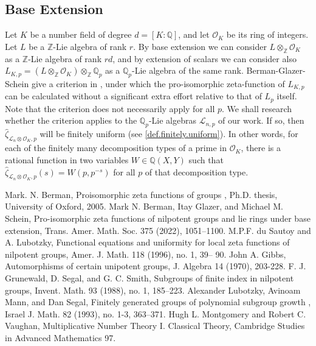\documentclass[12pt]{article}
\begin{document}
\subsection{Base Extension}
Let $K$ be a number field of degree $d=[K:\mathbb{Q}]$, and let $\mathcal{O}_K$ be its ring of integers. Let $L$ be a $\mathbb{Z}$-Lie algebra of rank $r$. By base extension we can consider $L\otimes_{\mathbb{Z}}\mathcal{O}_K$ as a $\mathbb{Z}$-Lie algebra of rank $rd$, and by extension of scalars we can consider also $L_{K,p}=(L\otimes_{\mathbb{Z}}\mathcal{O}_K)\otimes_{\mathbb{Z}}\mathbb{Q}_p$ as a $\mathbb{Q}_p$-Lie algebra of the same rank. Berman-Glazer-Schein give a criterion in \cite{BermanGlazerSchein}, under which the pro-isomorphic zeta-function of $L_{K,p}$ can be calculated without a significant extra effort relative to that of $L_p$ itself. Note that the criterion does not necessarily apply for all $p$. We shall research whether the criterion applies to the $\mathbb{Q}_p$-Lie algebras $\mathcal{L}_{n,p}$ of our work. If so, then $\hat\zeta_{\mathcal{L}_n\otimes\mathcal{O}_K,p}$ will be finitely uniform (see \ref{def.finitely.uniform}). In other words, for each of the finitely many decomposition types of a prime in $\mathcal{O}_K$, there is a rational function in two variables $W\in\mathbb{Q}(X,Y)$ such that $\hat\zeta_{\mathcal{L}_n\otimes\mathcal{O}_K,p}(s)=W(p,p^{-s})$ for all $p$ of that decomposition type.
\begin{thebibliography}{2}
 Mark. N. Berman,
Proisomorphic zeta functions of groups
, Ph.D. thesis, University of Oxford,
2005.
 Mark N. Berman, Itay Glazer, and Michael M. Schein, Pro-isomorphic zeta functions of nilpotent groups and lie rings under base extension, Trans. Amer. Math. Soc. 375 (2022), 1051–1100.
 M.P.F. du Sautoy and A. Lubotzky, Functional equations and uniformity for
local zeta functions of nilpotent groups, Amer. J. Math. 118 (1996), no. 1, 39–
90.
 John A. Gibbs, Automorphisms of certain unipotent groups, J. Algebra 14 (1970), 203-228.
 F. J. Grunewald, D. Segal, and G. C. Smith, Subgroups of finite index in nilpotent groups,
Invent. Math. 93 (1988), no. 1, 185–223.
 Alexander Lubotzky, Avinoam Mann, and Dan Segal,
Finitely generated groups of polynomial
subgroup growth
, Israel J. Math.
82
(1993), no. 1-3, 363–371.
 Hugh L. Montgomery and Robert C. Vaughan, Multiplicative Number Theory I. Classical Theory, Cambridge Studies in Advanced Mathematics 97.
\end{thebibliography}
\end{document}

